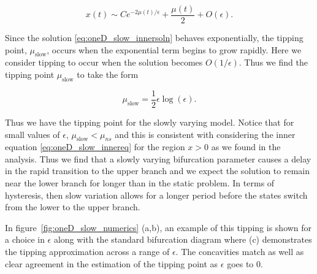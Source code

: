 \begin{equation}\label{eq:oneD_slow_innersoln}
x(t)\sim Ce^{-2\mu(t)/\epsilon}+\frac{\mu(t)}{2}+O(\epsilon).
\end{equation}

Since the solution \eqref{eq:oneD_slow_innersoln} behaves exponentially, the tipping point, $\mu_{\text{slow}}$, occurs when the exponential term begins to grow rapidly. Here we consider tipping to occur when the solution becomes $O(1/\epsilon)$. Thus we find the tipping point $\mu_{\text{slow}}$ to take the form

\begin{equation}\label{eq:oneD_slow_tipping}
\mu_{\text{slow}}= \frac{1}{2}\epsilon \log (\epsilon).
\end{equation}

Thus we have the tipping point for the slowly varying model. Notice that for small values of $\epsilon$, $\mu_{\text{slow}}<\mu_{ns}$ and this is consistent with considering the inner equation \eqref{eq:oneD_slow_innereq} for the region $x>0$ as we found in the analysis. Thus we find that a slowly varying bifurcation parameter causes a delay in the rapid transition to the upper branch and we expect the solution to remain near the lower branch for longer than in the static problem. In terms of hysteresis, then slow variation allows for a longer period before the states switch from the lower to the upper branch.

In figure~\ref{fig:oneD_slow_numerics} (a,b), an example of this tipping is shown for a choice in $\epsilon$ along with the standard bifurcation diagram where (c) demonstrates the tipping approximation across a range of $\epsilon$. The concavities match as well as clear agreement in the estimation of the tipping point as $\epsilon$ goes to 0.


